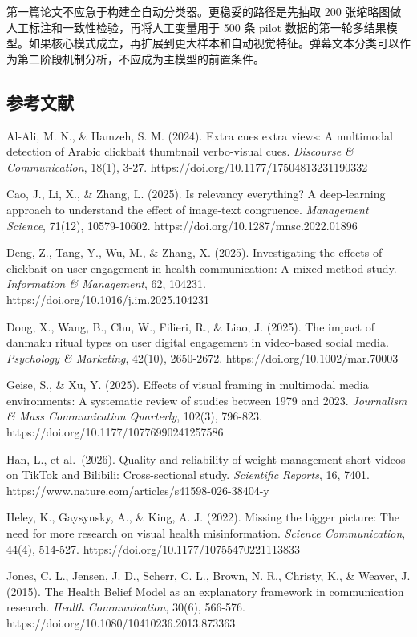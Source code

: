 \documentclass[
  12pt,
]{article}
\begin{document}
第一篇论文不应急于构建全自动分类器。更稳妥的路径是先抽取 200
张缩略图做人工标注和一致性检验，再将人工变量用于 500 条 pilot
数据的第一轮多结果模型。如果核心模式成立，再扩展到更大样本和自动视觉特征。弹幕文本分类可以作为第二阶段机制分析，不应成为主模型的前置条件。

\subsection{参考文献}\label{ux53c2ux8003ux6587ux732e}

Al-Ali, M. N., \& Hamzeh, S. M. (2024). Extra cues extra views: A
multimodal detection of Arabic clickbait thumbnail verbo-visual cues.
\emph{Discourse \& Communication}, 18(1), 3-27.
https://doi.org/10.1177/17504813231190332

Cao, J., Li, X., \& Zhang, L. (2025). Is relevancy everything? A
deep-learning approach to understand the effect of image-text
congruence. \emph{Management Science}, 71(12), 10579-10602.
https://doi.org/10.1287/mnsc.2022.01896

Deng, Z., Tang, Y., Wu, M., \& Zhang, X. (2025). Investigating the
effects of clickbait on user engagement in health communication: A
mixed-method study. \emph{Information \& Management}, 62, 104231.
https://doi.org/10.1016/j.im.2025.104231

Dong, X., Wang, B., Chu, W., Filieri, R., \& Liao, J. (2025). The impact
of danmaku ritual types on user digital engagement in video-based social
media. \emph{Psychology \& Marketing}, 42(10), 2650-2672.
https://doi.org/10.1002/mar.70003

Geise, S., \& Xu, Y. (2025). Effects of visual framing in multimodal
media environments: A systematic review of studies between 1979 and
2023. \emph{Journalism \& Mass Communication Quarterly}, 102(3),
796-823. https://doi.org/10.1177/10776990241257586

Han, L., et al.~(2026). Quality and reliability of weight management
short videos on TikTok and Bilibili: Cross-sectional study.
\emph{Scientific Reports}, 16, 7401.
https://www.nature.com/articles/s41598-026-38404-y

Heley, K., Gaysynsky, A., \& King, A. J. (2022). Missing the bigger
picture: The need for more research on visual health misinformation.
\emph{Science Communication}, 44(4), 514-527.
https://doi.org/10.1177/10755470221113833

Jones, C. L., Jensen, J. D., Scherr, C. L., Brown, N. R., Christy, K.,
\& Weaver, J. (2015). The Health Belief Model as an explanatory
framework in communication research. \emph{Health Communication}, 30(6),
566-576. https://doi.org/10.1080/10410236.2013.873363
\end{document}
